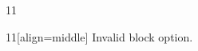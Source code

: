 \documentclass[paper=A4]{ropas-poster}
\begin{document}
\begin{postergrid}{1}{1}
\begin{posterblock}{1}{1}[align=middle]
Invalid block option.
\end{posterblock}
\end{postergrid}
\end{document}
